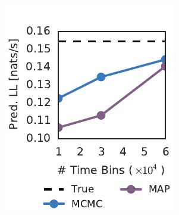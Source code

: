 \begin{figure}[t!]
\begin{subfigure}[b]{1.8in}
    \includegraphics[width=\textwidth]{figures/ch5/synth_rgc_pred_ll.pdf}
    \label{fig:synth_rgc_predll}
  \end{subfigure}
  ~
  \begin{subfigure}[b]{1.8in}
    \centering
    \caption{}
    \vspace{-.25in}

\end{subfigure}
\end{figure}
